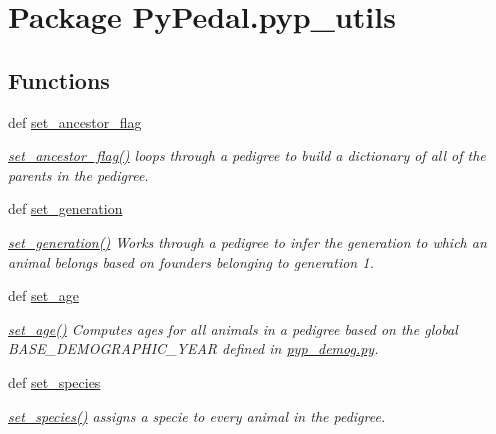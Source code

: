 \hypertarget{namespacePyPedal_1_1pyp__utils}{
\section{Package Py\-Pedal.pyp\_\-utils}
\label{namespacePyPedal_1_1pyp__utils}
}


\subsection*{Functions}
\begin{CompactItemize}
\item 
def \hyperlink{namespacePyPedal_1_1pyp__utils_fa9c95bf96313a8a0c9d5b2dfd9bd0a5}{set\_\-ancestor\_\-flag}
\begin{CompactList}\small\item\em \hyperlink{namespacePyPedal_1_1pyp__utils_fa9c95bf96313a8a0c9d5b2dfd9bd0a5}{set\_\-ancestor\_\-flag()} loops through a pedigree to build a dictionary of all of the parents in the pedigree. \item\end{CompactList}\item 
def \hyperlink{namespacePyPedal_1_1pyp__utils_b5ebcd78052921a2dfbf5c5f088dd95e}{set\_\-generation}
\begin{CompactList}\small\item\em \hyperlink{namespacePyPedal_1_1pyp__utils_b5ebcd78052921a2dfbf5c5f088dd95e}{set\_\-generation()} Works through a pedigree to infer the generation to which an animal belongs based on founders belonging to generation 1. \item\end{CompactList}\item 
def \hyperlink{namespacePyPedal_1_1pyp__utils_2a22bff8204191703ab00d42382b877d}{set\_\-age}
\begin{CompactList}\small\item\em \hyperlink{namespacePyPedal_1_1pyp__utils_2a22bff8204191703ab00d42382b877d}{set\_\-age()} Computes ages for all animals in a pedigree based on the global BASE\_\-DEMOGRAPHIC\_\-YEAR defined in \hyperlink{pyp__demog_8py-source}{pyp\_\-demog.py}. \item\end{CompactList}\item 
def \hyperlink{namespacePyPedal_1_1pyp__utils_d2010f93ea63cd90f24b683c2ed0eb73}{set\_\-species}
\begin{CompactList}\small\item\em \hyperlink{namespacePyPedal_1_1pyp__utils_d2010f93ea63cd90f24b683c2ed0eb73}{set\_\-species()} assigns a specie to every animal in the pedigree. \item\end{CompactList}\item 

\end{CompactItemize}
